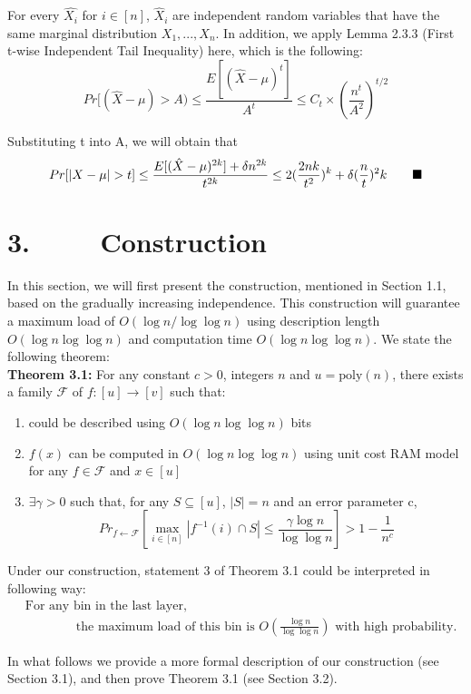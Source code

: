 \documentclass[a4paper, english]{paper}
\begin{document}
	 For every $\hat{X_i}$ for $i \in [n]$, $\hat{X}_i$ are independent random variables that have the same marginal distribution $X_1, ..., X_n$. In addition, we apply Lemma 2.3.3 (First t-wise Independent Tail Inequality) here, which is the following: 
	 $$ Pr[(\hat{X}-\mu) > A) \le \frac{E[(\hat{X}-\mu)^t]}{A^t} \le C_t \times (\frac{n^t}{A^2})^{t/2} $$ 
	 \par Substituting t into A, we will obtain that
	 $$ Pr[|X - \mu| > t] \le \frac{E[(\hat{X}-\mu)^{2k}] + \delta n^{2k}}{t^{2k}} \le 2(\frac{2nk}{t^2})^k + \delta (\frac{n}{t})^2k \qquad \hfill\blacksquare$$ 
		
	\section{3. $\qquad$ Construction}
In this section, we will first present the construction, mentioned in Section 1.1, based on the gradually increasing independence. This construction will guarantee a maximum load of  $O(\log n/\log\log n)$ using description length $O(\log n\log\log n)$ and computation time $O(\log n\log\log n)$. We state the following theorem: \\
	
	\noindent\textbf{Theorem 3.1:} For any constant $c>0$, integers $n$ and $u=\text{poly}(n)$, there exists a family  $\mathscr{F}$ of $f:[u]\rightarrow[v]$ such that:
	\begin{enumerate}
	\item could be described using $O(\log n \log\log n)$ bits
	\item $f(x)$ can be computed in $O(\log n \log\log n)$ using unit cost RAM model for any $f\in \mathscr{F}$ and $x\in[u]$
	\item $\exists \gamma>0$ such that, for any $S\subseteq[u]$, $|S|=n$ and an error parameter c,
		$${Pr}_{f\leftarrow \mathscr{F}}\left[\max_{i\in[n]}|f^{-1}(i) \cap S|\le \frac{\gamma\log n}{\log\log n}\right]> 1-\frac1{n^c}$$
	\end{enumerate}\par
	Under our construction, statement 3 of Theorem 3.1 could be interpreted in following way:
	\begin{align*}
	&\text{For any bin in the last layer,}\\
	& \qquad\qquad\text{the maximum load of this bin is } O(\frac{\log n}{\log\log n}) \text{ with high probability.}
	\end{align*}\par
	In what follows we provide a more formal description of our construction (see Section 3.1), and then prove Theorem 3.1 (see Section 3.2).
	
\end{document}
